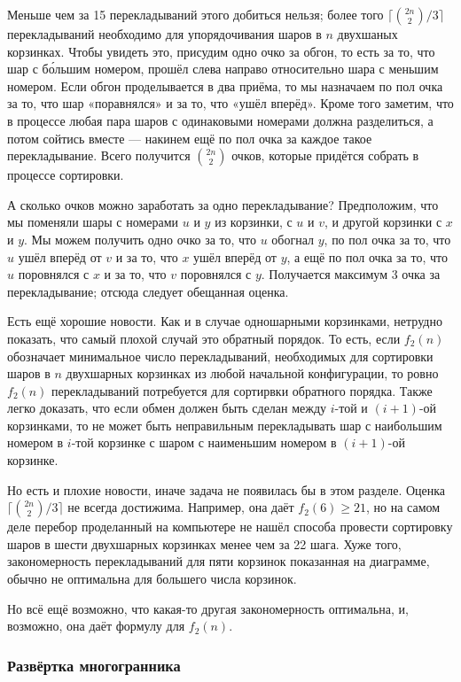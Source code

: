 Меньше чем за 15 перекладываний этого добиться нельзя; более того $\lceil\binom{2n}{2}/3\rceil$ перекладываний необходимо для упорядочивания шаров в $n$ двухшаных корзинках.
Чтобы увидеть это, присудим одно очко за обгон, то есть за то, что шар с б\'{о}льшим номером, прошёл слева направо относительно шара с меньшим номером.
Если обгон проделывается в два приёма, то мы назначаем по пол очка за то, что шар «поравнялся» и за то, что «ушёл вперёд».
Кроме того заметим, что в процессе любая пара шаров с одинаковыми номерами должна разделиться, а потом сойтись вместе --- накинем ещё по пол очка за каждое такое перекладывание. 
Всего получится $\binom{2n}2$ очков, которые придётся собрать в процессе сортировки.

А сколько очков можно заработать за одно перекладывание?
Предположим, что мы поменяли шары с номерами $u$ и $y$ из корзинки, с $u$ и $v$, и другой корзинки с $x$ и $y$.
Мы можем получить одно очко за то, что $u$ обогнал $y$,
по пол очка за то, что $u$ ушёл вперёд от $v$
и за то, что $x$ ушёл вперёд от $y$,
а ещё по пол очка за то, что $u$ поровнялся с $x$ 
и за то, что $v$ поровнялся с $y$.
Получается максимум 3 очка за перекладывание;
отсюда следует обещанная оценка.


Есть ещё хорошие новости.
Как и в случае одношарными корзинками, нетрудно показать, что самый плохой случай это обратный порядок.
То есть, если $f_2(n)$ обозначает минимальное число перекладываний, необходимых для сортировки шаров в $n$ двухшарных корзинках из любой начальной конфигурации, то ровно $f_2(n)$ перекладываний потребуется для сортирвки обратного порядка.
Также легко доказать, что если обмен должен быть сделан между $i$-той и $(i+1)$-ой корзинками, то не может быть неправильным перекладывать шар с наибольшим номером в $i$-той корзинке с шаром с наименьшим номером в $(i+1)$-ой корзинке.

Но есть и плохие новости, иначе задача не появилась бы в этом разделе.
Оценка $\lceil\binom{2n}{2}/3\rceil$ не всегда достижима.
Например, она даёт $f_2(6)\ge 21$, но на самом деле перебор проделанный на компьютере не нашёл способа провести сортировку шаров в шести двухшарных корзинках менее чем за 22 шага.
Хуже того, закономерность перекладываний для пяти корзинок показанная на диаграмме, обычно не оптимальна для большего числа корзинок.

Но всё ещё возможно, что какая-то другая закономерность оптимальна, и, возможно, она даёт формулу для $f_2(n)$.

\subsubsection*{Развёртка многогранника}

